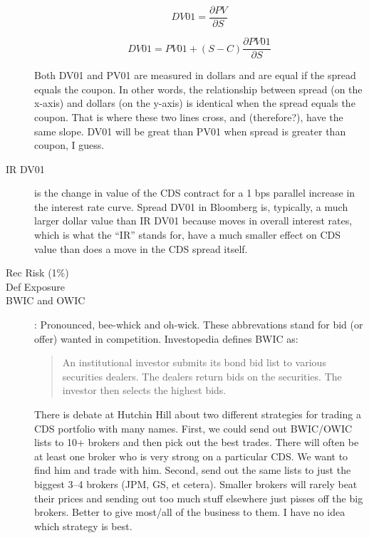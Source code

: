 \documentclass[12pt]{article}
\begin{document}
\begin{description}
\begin{displaymath}
  DV01 = \frac{\partial PV}{\partial S}
\end{displaymath}

\begin{displaymath}
  DV01 = PV01 + (S - C) \frac{\partial PV01}{\partial S}
\end{displaymath}
  
Both DV01 and PV01 are measured in dollars and are equal if the spread equals the coupon. In other words, the relationship between spread (on the x-axis) and dollars (on the y-axis) is identical when the spread equals the coupon. That is where these two lines cross, and (therefore?), have the same slope. DV01 will be great than PV01 when spread is greater than coupon, I guess.
  
  \item[IR DV01] is the change in value of the CDS contract for a 1 bps parallel increase in the interest rate curve. Spread DV01 in Bloomberg is, typically, a much larger dollar value than IR DV01 because moves in overall interest rates, which is what the ``IR'' stands for, have a much smaller effect on CDS value than does a move in the CDS spread itself. 
  \item[Rec Risk (1\%)]
  \item[Def Exposure]
  
 \item[BWIC and OWIC]: Pronounced, bee-whick and oh-wick. These abbrevations stand for bid (or offer) wanted in competition. Investopedia defines BWIC as:
  
  \begin{quote}
An institutional investor submits its bond bid list to various securities dealers. The dealers return bids on the securities. The investor then selects the highest bids.
\end{quote}

There is debate at Hutchin Hill about two different strategies for trading a CDS portfolio with many names. First, we could send out BWIC/OWIC lists to 10+ brokers and then pick out the best trades. There will often be at least one broker who is very strong on a particular CDS. We want to find him and trade with him. Second, send out the same lists to just the biggest 3--4 brokers (JPM, GS, et cetera). Smaller brokers will rarely beat their prices and sending out too much stuff elsewhere just pisses off the big brokers. Better to give most/all of the business to them. I have no idea which strategy is best.


\end{description}
\end{document}
